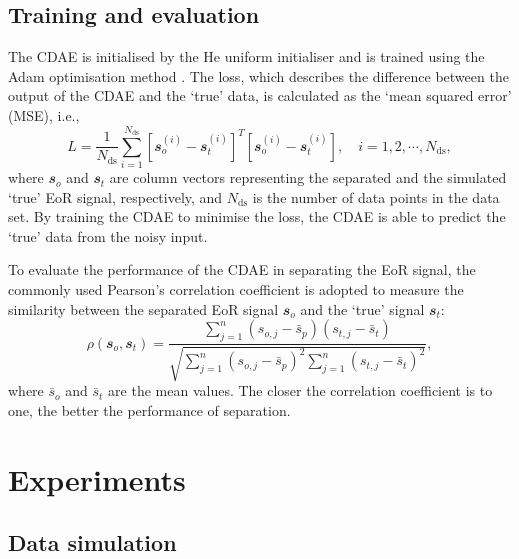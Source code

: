 \documentclass[letters,a4paper,fleqn,usenatbib]{mnras}
\newcommand{\R}[1]{\mathrm{#1}}
\newcommand{\B}[1]{\mathbfit{#1}}
\begin{document}
\subsection{Training and evaluation}
\label{sec:train-eval}

The CDAE is initialised by the He uniform initialiser \citep{he2015}
and is trained using the Adam optimisation method \citep{kingma2015}.
The loss, which describes the difference between the output of the CDAE
and the `true' data, is calculated as the `mean squared error' (MSE),
i.e.,
\begin{equation}
  \label{eq:loss}
  L = \frac{1}{N_{\R{ds}}} \sum_{i=1}^{N_{\R{ds}}}
    \left[ \B{s}_o^{(i)} - \B{s}_t^{(i)} \right]^T
    \left[ \B{s}_o^{(i)} - \B{s}_t^{(i)} \right],
    \quad i = 1, 2, \cdots, N_{\R{ds}},
\end{equation}
where
$\B{s}_o$ and $\B{s}_t$ are column vectors representing the separated
and the simulated `true' EoR signal, respectively,
and $N_{\R{ds}}$ is the number of data points in the data set.
By training the CDAE to minimise the loss, the CDAE is able to predict
the `true' data from the noisy input.

To evaluate the performance of the CDAE in separating the EoR signal,
the commonly used Pearson's correlation coefficient
\citep[e.g.,][]{harker2009,chapman2013}
is adopted to measure the similarity between the separated EoR signal
$\B{s}_o$ and the `true' signal $\B{s}_t$:
\begin{equation}
  \label{eq:corrcoef}
  \rho(\B{s}_o, \B{s}_t) =
    \frac{\sum_{j=1}^{n}(s_{o,j}-\bar{s}_p)(s_{t,j}-\bar{s}_t)}{
      \sqrt{\sum_{j=1}^{n}(s_{o,j}-\bar{s}_p)^2
        \sum_{j=1}^{n}(s_{t,j}-\bar{s}_t)^2}
    },
\end{equation}
where $\bar{s}_o$ and $\bar{s}_t$ are the mean values.
The closer the correlation coefficient is to one, the better the
performance of separation.


\section{Experiments}
\label{sec:experiments}

\subsection{Data simulation}
\label{sec:simulation}
\end{document}
